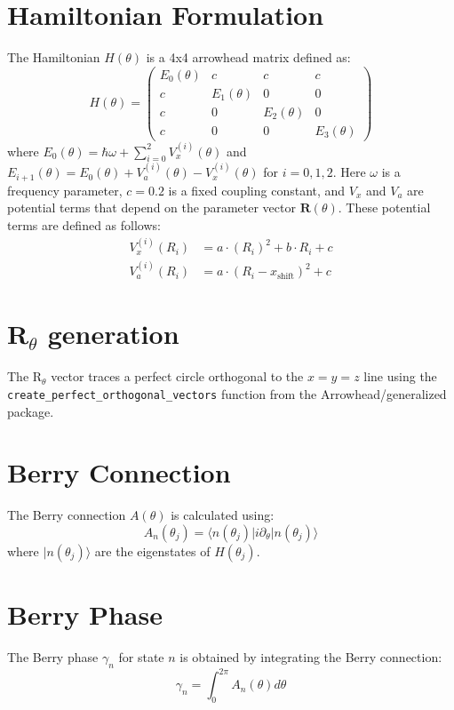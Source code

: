 \documentclass{article}
\begin{document}
\section{Hamiltonian Formulation}
The Hamiltonian $H(\theta)$ is a 4x4 arrowhead matrix defined as:
\begin{equation}
H(\theta) = \begin{pmatrix}
E_0(\theta) & c & c & c \\
c & E_1(\theta) & 0 & 0 \\
c & 0 & E_2(\theta) & 0 \\
c & 0 & 0 & E_3(\theta)
\end{pmatrix}
\end{equation}
where $E_0(\theta) = \hbar\omega + \sum_{i=0}^2 V_x^{(i)}(\theta)$ and $E_{i+1}(\theta) = E_0(\theta) + V_a^{(i)}(\theta) - V_x^{(i)}(\theta)$ for $i=0,1,2$.
Here $\omega$ is a frequency parameter, $c = 0.2$ is a fixed coupling constant, and $V_x$ and $V_a$ are potential terms that depend on the parameter vector $\bm{R}(\theta)$. These potential terms are defined as follows:
\begin{align}
V_x^{(i)}(R_i) &= a \cdot (R_i)^2 + b \cdot R_i + c \\
V_a^{(i)}(R_i) &= a \cdot (R_i - x_{\text{shift}})^2 + c
\end{align}

\section{R$_{\theta}$ generation}
The R$_{\theta}$ vector traces a perfect circle orthogonal to the $x=y=z$ line using the \texttt{create\_perfect\_orthogonal\_vectors} function from the Arrowhead/generalized package.


\section{Berry Connection}
The Berry connection $A(\theta)$ is calculated using:
\begin{equation}
A_{n}(\theta_j) = \langle n(\theta_j) | i \partial_\theta | n(\theta_j) \rangle
\end{equation}
where $|n(\theta_j)\rangle$ are the eigenstates of $H(\theta_j)$.

\section{Berry Phase}
The Berry phase $\gamma_n$ for state $n$ is obtained by integrating the Berry connection:
\begin{equation}
\gamma_n = \int_0^{2\pi} A_n(\theta) d\theta
\end{equation}
\end{document}
